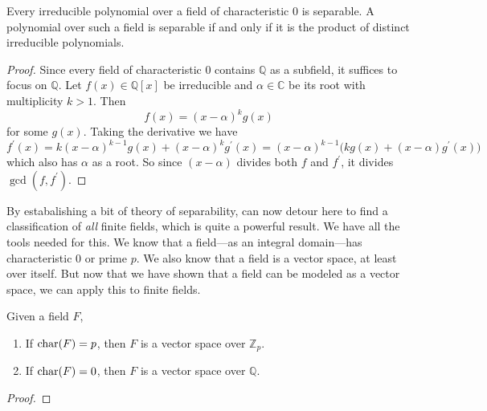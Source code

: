   \begin{corollary}
    \label{thm:sep_char}
    Every irreducible polynomial over a field of characteristic $0$ is separable. A polynomial over such a field is separable if and only if it is the product of distinct irreducible polynomials. 
  \end{corollary}
  \begin{proof}
    Since every field of characteristic $0$ contains $\mathbb{Q}$ as a subfield, it suffices to focus on $\mathbb{Q}$. Let $f(x) \in \mathbb{Q}[x]$ be irreducible and $\alpha \in \mathbb{C}$ be its root with multiplicity $k > 1$. Then 
    \begin{equation}
      f(x) = (x - \alpha)^k g(x)
    \end{equation}
    for some $g(x)$. Taking the derivative we have 
    \begin{equation}
      f^\prime(x) = k (x - \alpha)^{k-1} g(x) + (x - \alpha)^k g^\prime (x) = (x - \alpha)^{k-1} \big( k g(x) + (x - \alpha) g^\prime(x) \big)
    \end{equation}
    which also has $\alpha$ as a root. So since $(x - \alpha)$ divides both $f$ and $f^\prime$, it divides $\gcd(f, f^\prime)$. 
  \end{proof}

  By estabalishing a bit of theory of separability, can now detour here to find a classification of \textit{all} finite fields, which is quite a powerful result. We have all the tools needed for this. We know that a field---as an integral domain---has characteristic $0$ or prime $p$. We also know that a field is a vector space, at least over itself. But now that we have shown that a field can be modeled as a vector space, we can apply this to finite fields. 

  \begin{theorem}
    \label{thm:char_field}
    Given a field $F$, 
    \begin{enumerate}
      \item If $\Char(F) = p$, then $F$ is a vector space over $\mathbb{Z}_p$. 
      \item If $\Char(F) = 0$, then $F$ is a vector space over $\mathbb{Q}$. 
    \end{enumerate}
  \end{theorem}
  \begin{proof}
    
  \end{proof} 

